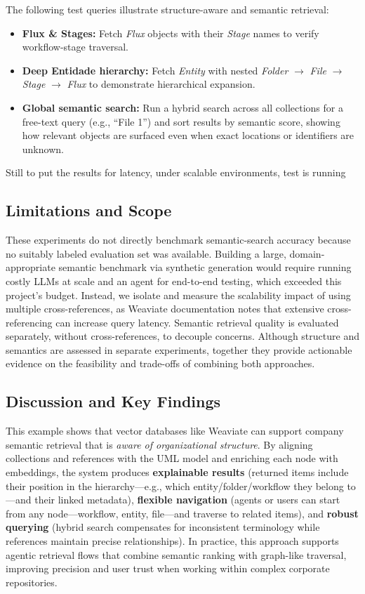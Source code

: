 The following test queries illustrate structure-aware and semantic retrieval:
\begin{itemize}
    \item \textbf{Flux \& Stages:} Fetch \textit{Flux} objects with their \textit{Stage} names to verify workflow-stage traversal.
    \item \textbf{Deep Entidade hierarchy:} Fetch \textit{Entity} with nested \textit{Folder} \(\rightarrow\) \textit{File} \(\rightarrow\) \textit{Stage} \(\rightarrow\) \textit{Flux} to demonstrate hierarchical expansion.
    \item \textbf{Global semantic search:} Run a hybrid search across all collections for a free-text query (e.g., “File 1”) and sort results by semantic score, showing how relevant objects are surfaced even when exact locations or identifiers are unknown.
\end{itemize}
Still to put the results for latency, under scalable environments, test is running

\subsection{Limitations and Scope}
These experiments do not directly benchmark semantic-search accuracy because no suitably labeled evaluation set was available. Building a large, domain-appropriate semantic benchmark via synthetic generation would require running costly \glspl{LLM} at scale and an agent for end-to-end testing, which exceeded this project's budget. Instead, we isolate and measure the scalability impact of using multiple cross-references, as Weaviate documentation \cite{weaviate} notes that extensive cross-referencing can increase query latency. Semantic retrieval quality is evaluated separately, without cross-references, to decouple concerns. Although structure and semantics are assessed in separate experiments, together they provide actionable evidence on the feasibility and trade-offs of combining both approaches.
\subsection{Discussion and Key Findings}
This example shows that vector databases like Weaviate can support company semantic retrieval that is \textit{aware of organizational structure}. By aligning collections and references with the UML model and enriching each node with embeddings, the system produces \textbf{explainable results} (returned items include their position in the hierarchy—e.g., which entity/folder/workflow they belong to—and their linked metadata), \textbf{flexible navigation} (agents or users can start from any node—workflow, entity, file—and traverse to related items), and \textbf{robust querying} (hybrid search compensates for inconsistent terminology while references maintain precise relationships).
In practice, this approach supports agentic retrieval flows that combine semantic ranking with graph-like traversal, improving precision and user trust when working within complex corporate repositories.


